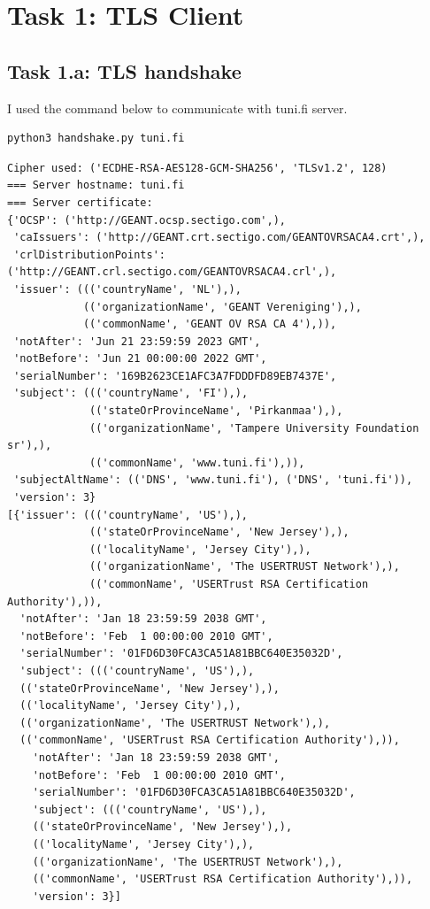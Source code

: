 \section{Task 1: TLS Client}
\subsection{Task 1.a: TLS handshake}
%
I used the command below to communicate with {\selectfont tuni.fi}
server.

\begin{lstlisting}[language=bash]
    python3 handshake.py tuni.fi
\end{lstlisting}

\begin{lstlisting}[caption=A TLS hanshake connecting to \url{www.tuni.fi}.,
    label={lst:handshake_log}]
Cipher used: ('ECDHE-RSA-AES128-GCM-SHA256', 'TLSv1.2', 128)
=== Server hostname: tuni.fi
=== Server certificate:
{'OCSP': ('http://GEANT.ocsp.sectigo.com',),
 'caIssuers': ('http://GEANT.crt.sectigo.com/GEANTOVRSACA4.crt',),
 'crlDistributionPoints': ('http://GEANT.crl.sectigo.com/GEANTOVRSACA4.crl',),
 'issuer': ((('countryName', 'NL'),),
            (('organizationName', 'GEANT Vereniging'),),
            (('commonName', 'GEANT OV RSA CA 4'),)),
 'notAfter': 'Jun 21 23:59:59 2023 GMT',
 'notBefore': 'Jun 21 00:00:00 2022 GMT',
 'serialNumber': '169B2623CE1AFC3A7FDDDFD89EB7437E',
 'subject': ((('countryName', 'FI'),),
             (('stateOrProvinceName', 'Pirkanmaa'),),
             (('organizationName', 'Tampere University Foundation sr'),),
             (('commonName', 'www.tuni.fi'),)),
 'subjectAltName': (('DNS', 'www.tuni.fi'), ('DNS', 'tuni.fi')),
 'version': 3}
[{'issuer': ((('countryName', 'US'),),
             (('stateOrProvinceName', 'New Jersey'),),
             (('localityName', 'Jersey City'),),
             (('organizationName', 'The USERTRUST Network'),),
             (('commonName', 'USERTrust RSA Certification Authority'),)),
  'notAfter': 'Jan 18 23:59:59 2038 GMT',
  'notBefore': 'Feb  1 00:00:00 2010 GMT',
  'serialNumber': '01FD6D30FCA3CA51A81BBC640E35032D',
  'subject': ((('countryName', 'US'),),
  (('stateOrProvinceName', 'New Jersey'),),
  (('localityName', 'Jersey City'),),
  (('organizationName', 'The USERTRUST Network'),),
  (('commonName', 'USERTrust RSA Certification Authority'),)),
    'notAfter': 'Jan 18 23:59:59 2038 GMT',
    'notBefore': 'Feb  1 00:00:00 2010 GMT',
    'serialNumber': '01FD6D30FCA3CA51A81BBC640E35032D',
    'subject': ((('countryName', 'US'),),
    (('stateOrProvinceName', 'New Jersey'),),
    (('localityName', 'Jersey City'),),
    (('organizationName', 'The USERTRUST Network'),),
    (('commonName', 'USERTrust RSA Certification Authority'),)),
    'version': 3}]
\end{lstlisting}

